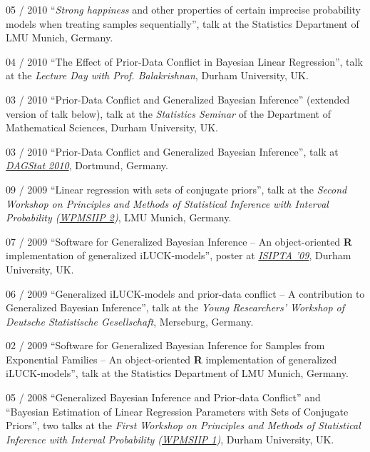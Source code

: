 \documentclass[a4paper]{simplecv}
\begin{document}
\begin{topic}
\item[05 / 2010] ``\emph{Strong happiness} and other properties of certain imprecise probability models when treating samples sequentially'',
                 talk at the Statistics Department of LMU Munich, Germany.

\item[04 / 2010] ``The Effect of Prior-Data Conflict in Bayesian Linear Regression'', talk at the
                 \emph{Lecture Day with Prof. Balakrishnan}, Durham University, UK.

\item[03 / 2010] ``Prior-Data Conflict and Generalized Bayesian Inference'' (extended version of talk below), talk at the
                 \emph{Statistics Seminar} of the Department of Mathematical Sciences, Durham University, UK.

\item[03 / 2010] ``Prior-Data Conflict and Generalized Bayesian Inference'', talk at
                 \emph{\href{http://www.statistik.tu-dortmund.de/DAGStat2010/en/index.html}{DAGStat 2010}}, Dortmund, Germany.

\item[09 / 2009] ``Linear regression with sets of conjugate priors'', talk at the
                 \emph{Second Workshop on Principles and Methods of Statistical Inference with Interval Probability (\href{http://www.stat.uni-muenchen.de/~walter/workshop0909/}{WPMSIIP 2})}, LMU Munich, Germany.

\item[07 / 2009] ``Software for Generalized Bayesian Inference -- An object-oriented \textbf{R} implementation of generalized iLUCK-models'', poster at
                 \emph{\href{http://www.sipta.org/isipta09/}{ISIPTA '09}}, Durham University, UK.

\item[06 / 2009] ``Generalized iLUCK-models and prior-data conflict -- A contribution to Generalized Bayesian Inference'', talk at the
                 \emph{Young Researchers' Workshop of Deutsche Statistische Gesellschaft}, Merseburg, Germany.

\item[02 / 2009] ``Software for Generalized Bayesian Inference for Samples from Exponential Families -- An object-oriented \textbf{R} implementation of generalized iLUCK-models'', talk at
                 the Statistics Department of LMU Munich, Germany.

\item[05 / 2008] ``Generalized Bayesian Inference and Prior-data Conflict'' and ``Bayesian Estimation of Linear Regression Parameters with Sets of Conjugate Priors'', two talks at the
                 \emph{First Workshop on Principles and Methods of Statistical Inference with Interval Probability (\href{http://www.maths.dur.ac.uk/users/matthias.troffaes/workshopip2008/index.html}{WPMSIIP 1})}, Durham University, UK.


\end{topic}
\end{document}
